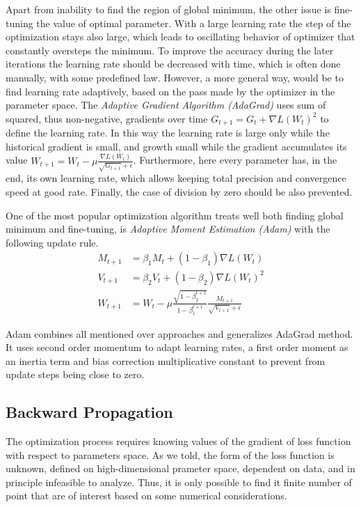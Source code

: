 Apart from inability to find the region of global minimum, the other issue is fine-tuning the value of optimal parameter.
With a large learning rate the step of the optimization stays also large, which leads to oscillating behavior of optimizer that constantly oversteps the minimum.
To improve the accuracy during the later iterations the learning rate should be decreased with time, which is often done manually, with some predefined law. 
However, a more general way, would be to find learning rate adaptively, based on the pass made by the optimizer in the parameter space.
The \textit{Adaptive Gradient Algorithm (AdaGrad)} uses sum of squared, thus non-negative, gradients over time $G_{t+1} = G_{t}+\nabla L(W_{t})^2$ to define the learning rate.
In this way the learning rate is large only while the historical gradient is small, and growth small while the gradient accumulates its value $ W_{t+1} = W_{t} -\mu \frac{\nabla L(W_{t})}{\sqrt{G_{t+1}}+\epsilon} $.
Furthermore, here every parameter has, in the end, its own learning rate, which allows keeping total precision and convergence speed at good rate.
Finally, the case of division by zero should be also prevented. 
\medskip

One of the most popular optimization algorithm treats well both finding global minimum and fine-tuning, is \textit{Adaptive Moment Estimation (Adam)} with the following update rule.
\begin{align*}
	M_{t+1} & = \beta_{1}M_{t} + (1-\beta_{1})\nabla L(W_{t}) \\
	V_{t+1} & = \beta_{2} V_{t} + (1-\beta_{2})\nabla L(W_{t})^2 \\
	W_{t+1} & = W_{t} - \mu \frac{\sqrt{1-\beta_{2}^{t+1}}}{1-\beta_{1}^{t+1}} \frac{M_{t+1}}{\sqrt{V_{t+1}}+\epsilon}
\end{align*}		

Adam combines all mentioned over approaches and generalizes AdaGrad method.
It uses second order momentum to adapt learning rates, a first order moment as an inertia term and bias correction multiplicative constant to prevent from update steps being close to zero.

\subsection{Backward Propagation}

The optimization process requires knowing values of the gradient of loss function with respect to parameters space.
As we told, the form of the loss function is unknown, defined on high-dimensional prameter space, dependent on data, and in principle infeasible to analyze.
Thus, it is only possible to find it finite number of point that are of interest based on some numerical considerations.

